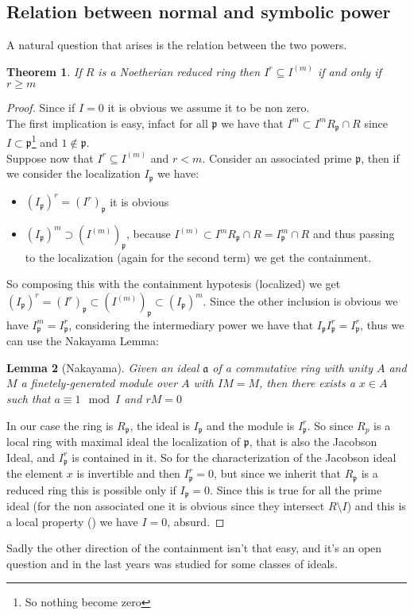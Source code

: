 \documentclass[]{article}
\theoremstyle{plain}
\newtheorem{teo}{Theorem}[section]
\newtheorem{lem}[teo]{Lemma}
\theoremstyle{remark}
\theoremstyle{definition}
\newcommand{\p}{\mathfrak{p}}
\newcommand{\A}{\mathfrak{a}}
\begin{document}



\subsection{Relation between normal and symbolic power}
A natural question that arises is the relation between the two powers.


\begin{teo}
	If $ R $ is a Noetherian reduced ring then $ I^r \subseteq I^{(m)}$  if and only if $ r \geq m $
\end{teo}
\begin{proof}
	Since if $ I=0 $ it is obvious we assume it to be non zero.\\
	The first implication is easy, infact for all $ \p $ we have that $ I^m \subset I^mR_\p \cap R $ since $ I \subset \p $\footnote{So nothing become zero} and $ 1 \not \in \p $.\\
	Suppose now that $ I^r \subseteq I^{(m)}$ and $ r < m $. Consider an associated prime $ \p $, then if we consider the localization $ I_\p $ we have:
	\begin{itemize}
	\item $ (I_\p)^r = (I^r)_\p $ it is obvious
	\item $ (I_\p)^m \supset (I^{(m)})_\p $, because $ I^{(m)} \subset I^mR_\p \cap R = I^m_\p \cap R $ and thus passing to the localization (again for the second term) we get the containment.
	\end{itemize}
	So composing this with the containment hypotesis (localized) we get $ (I_\p)^r = (I^r)_\p \subset (I^{(m)})_\p \subset (I_\p)^m $. Since the other inclusion is obvious we have $ I_\p^m= I_\p^r $, considering the intermediary power we have that $ I_\p I_\p^r =I_\p^r $, thus we can use the Nakayama Lemma:
	
	\begin{lem}[Nakayama]
		Given an ideal $ \A $ of a commutative ring with unity $ A $ and $ M $ a finetely-generated module over $ A $ with $ IM = M $, then there exists a $ x \in A $ such that $ a \equiv 1 \mod I $ and $ rM = 0 $
	\end{lem}
	In our case the ring is $ R_\p $, the ideal is $ I_\p $ and the module is $ I_\p^{r} $. So since $ R_p $ is a local ring with maximal ideal the localization of $ \p $, that is also the Jacobson Ideal, and $ I_\p ^r $ is contained in it. So for the characterization of the Jacobson ideal the element $ x $ is invertible and then $ I_\p^r = 0 $, but since we inherit that $ R_\p $ is a reduced ring this is possible only if $ I_\p = 0$. Since this is true for all the prime ideal (for the non associated one it is obvious since they intersect $ R \setminus I $) and this is a local property (\cite[Proposition 3.8]{AMCD}) we have $ I = 0 $, absurd.
\end{proof} 
Sadly the other direction of the containment isn't that easy, and it's an open question and in the last years was studied for some classes of ideals.
\end{document}
